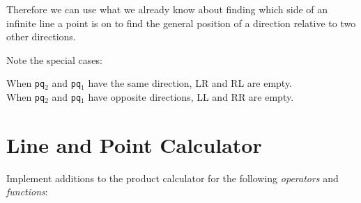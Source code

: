 \documentclass[12pt]{article}
\begin{document}
Therefore we can use what we already know about finding which side
of an infinite line a point is on
to find the general position of a direction relative to
two other directions.

Note the special cases:
\begin{indpar}{0.5in}
When {\tt pq$_2$} and {\tt pq$_1$} have the same direction,
LR and RL are empty.
\\[0.5ex]
When {\tt pq$_2$} and {\tt pq$_1$} have opposite directions,
LL and RR are empty.
\end{indpar}

\newpage

\section{Line and Point Calculator}
Implement additions to the product calculator for
the following {\em operators} and {\em functions}:
\end{document}

